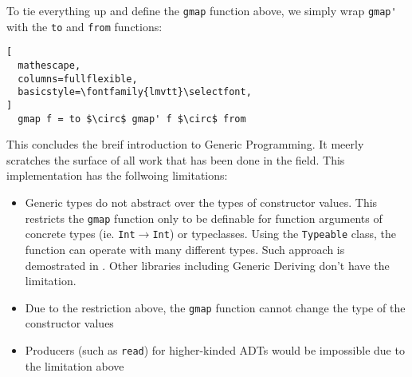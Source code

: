 \documentclass[8pt]{extarticle}
\begin{document}
To tie everything up and define the \verb+gmap+ function above, we simply wrap \verb+gmap'+ with the \verb+to+ and \verb+from+ functions:
\begin{lstlisting}[
  mathescape,
  columns=fullflexible,
  basicstyle=\fontfamily{lmvtt}\selectfont,
]
  gmap f = to $\circ$ gmap' f $\circ$ from
\end{lstlisting}
This concludes the breif introduction to Generic Programming. It meerly scratches the surface of all work that has been done in the field. This implementation has the follwoing limitations:
\begin{itemize}
\item Generic types do not abstract over the types of constructor values. This restricts the \verb+gmap+ function only to be definable for function arguments of concrete types (ie. \verb+Int+$\to$\verb+Int+) or typeclasses. Using the \verb+Typeable+ class, the function can operate with many different types. Such approach is demostrated in \cite{RegularGit}. Other libraries including Generic Deriving don't have the limitation.
\item Due to the restriction above, the \verb+gmap+ function cannot change the type of the constructor values
\item Producers (such as \verb+read+) for higher-kinded ADTs would be impossible due to the limitation above
\end{itemize}
\end{document}
